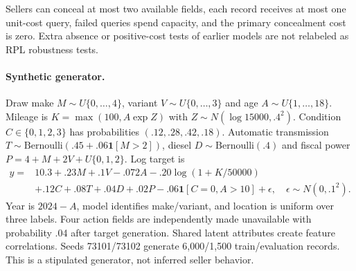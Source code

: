 \documentclass[11pt]{article}
\begin{document}
Sellers can conceal at most two available fields, each record receives at most
one unit-cost query, failed queries spend capacity, and the primary concealment
cost is zero. Extra absence or positive-cost tests of earlier models are not
relabeled as RPL robustness tests.

\paragraph{Synthetic generator.}
Draw make $M\sim U\{0,\ldots,4\}$, variant $V\sim U\{0,\ldots,3\}$ and
age $A\sim U\{1,\ldots,18\}$. Mileage is
$K=\max(100,A\exp Z)$ with $Z\sim N(\log15000,.4^2)$.
Condition $C\in\{0,1,2,3\}$ has probabilities $(.12,.28,.42,.18)$.
Automatic transmission $T\sim\mathrm{Bernoulli}(.45+.06\mathbf1[M>2])$,
diesel $D\sim\mathrm{Bernoulli}(.4)$ and fiscal power
$P=4+M+2V+U\{0,1,2\}$. Log target is
\begin{align*}
y={}&10.3+.23M+.1V-.072A-.20\log(1+K/50000)\\
 &+.12C+.08T+.04D+.02P-.06\mathbf1[C=0,A>10]+\epsilon,
 \quad\epsilon\sim N(0,.1^2).
\end{align*}
Year is $2024-A$, model identifies make/variant, and location is uniform over
three labels. Four action fields are independently made unavailable with
probability .04 after target generation. Shared latent attributes create
feature correlations. Seeds 73101/73102 generate 6,000/1,500 train/evaluation
records. This is a stipulated generator, not inferred seller behavior.
\end{document}
